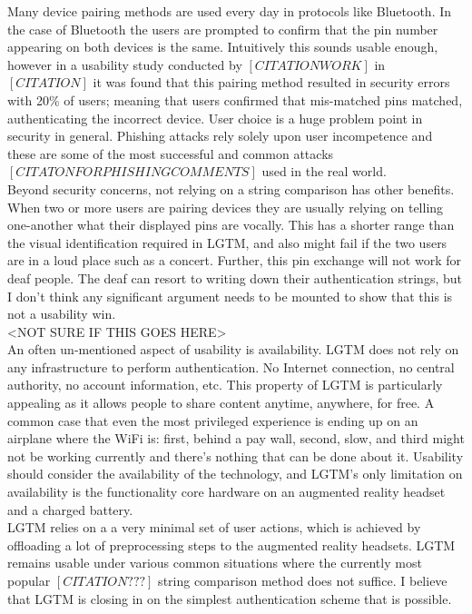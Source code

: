 \documentclass[12pt]{report}
\begin{document}
Many device pairing methods are used every day in protocols like Bluetooth. In the case of Bluetooth the users are prompted to confirm that the pin number appearing on both devices is the same. Intuitively this sounds usable enough, however in a usability study conducted by $[CITATION WORK]$ in $[CITATION]$ it was found that this pairing method resulted in security errors with 20\% of users; meaning that users confirmed that mis-matched pins matched, authenticating the incorrect device. User choice is a huge problem point in security in general. Phishing attacks rely solely upon user incompetence and these are some of the most successful and common attacks $[CITATON FOR PHISHING COMMENTS]$ used in the real world. \\

Beyond security concerns, not relying on a string comparison has other benefits. When two or more users are pairing devices they are usually relying on telling one-another what their displayed pins are vocally. This has a shorter range than the visual identification required in LGTM, and also might fail if the two users are in a loud place such as a concert. Further, this pin exchange will not work for deaf people. The deaf can resort to writing down their authentication strings, but I don't think any significant argument needs to be mounted to show that this is not a usability win. \\

<NOT SURE IF THIS GOES HERE> \\
An often un-mentioned aspect of usability is availability. LGTM does not rely on any infrastructure to perform authentication. No Internet connection, no central authority, no account information, etc. This property of LGTM is particularly appealing as it allows people to share content anytime, anywhere, for free. A common case that even the most privileged experience is ending up on an airplane where the WiFi is: first, behind a pay wall, second, slow, and third might not be working currently and there's nothing that can be done about it. Usability should consider the availability of the technology, and LGTM's only limitation on availability is the functionality core hardware on an augmented reality headset and a charged battery. \\

LGTM relies on a a very minimal set of user actions, which is achieved by offloading a lot of preprocessing steps to the augmented reality headsets. LGTM remains usable under various common situations where the currently most popular $[CITATION???]$ string comparison method does not suffice. I believe that LGTM is closing in on the simplest authentication scheme that is possible. \\
\end{document}
